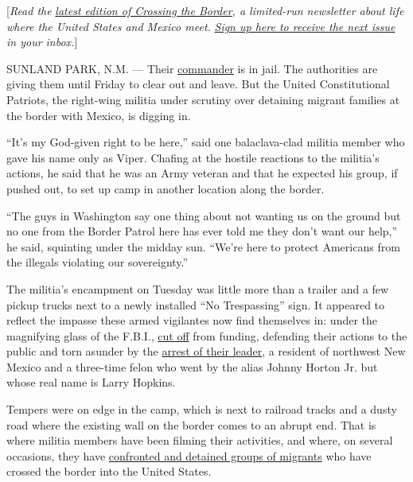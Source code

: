 {[}\emph{Read the}
\href{https://www.nytimes3xbfgragh.onion/2019/04/18/us/mexico-border-deaths.html?searchResultPosition=1}{\emph{latest
edition of Crossing the Border}}\emph{, a limited-run newsletter about
life where the United States and Mexico meet.}
\emph{\href{https://www.nytimes3xbfgragh.onion/newsletters/crossing-the-border?module=inline}{Sign
up here to receive the next issue}} \emph{in your inbox.}{]}

SUNLAND PARK, N.M. --- Their
\href{https://www.nytimes3xbfgragh.onion/2019/04/22/us/militia-border-new-mexico.html}{commander}
is in jail. The authorities are giving them until Friday to clear out
and leave. But the United Constitutional Patriots, the right-wing
militia under scrutiny over detaining migrant families at the border
with Mexico, is digging in.

``It's my God-given right to be here,'' said one balaclava-clad militia
member who gave his name only as Viper. Chafing at the hostile reactions
to the militia's actions, he said that he was an Army veteran and that
he expected his group, if pushed out, to set up camp in another location
along the border.

``The guys in Washington say one thing about not wanting us on the
ground but no one from the Border Patrol here has ever told me they
don't want our help,'' he said, squinting under the midday sun. ``We're
here to protect Americans from the illegals violating our sovereignty.''

The militia's encampment on Tuesday was little more than a trailer and a
few pickup trucks next to a newly installed ``No Trespassing'' sign. It
appeared to reflect the impasse these armed vigilantes now find
themselves in: under the magnifying glass of the F.B.I.,
\href{https://gizmodo.com/paypal-gofundme-yank-accounts-for-far-right-militia-ro-1834193555}{cut
off} from funding, defending their actions to the public and torn
asunder by the
\href{https://www.nytimes3xbfgragh.onion/2019/04/20/us/militia-arrest-border-new-mexico.html}{arrest
of their leader}, a resident of northwest New Mexico and a three-time
felon who went by the alias Johnny Horton Jr. but whose real name is
Larry Hopkins.

Tempers were on edge in the camp, which is next to railroad tracks and a
dusty road where the existing wall on the border comes to an abrupt end.
That is where militia members have been filming their activities, and
where, on several occasions, they have
\href{https://www.nytimes3xbfgragh.onion/2019/04/18/us/new-mexico-militia.html}{confronted
and detained groups of migrants} who have crossed the border into the
United States.

